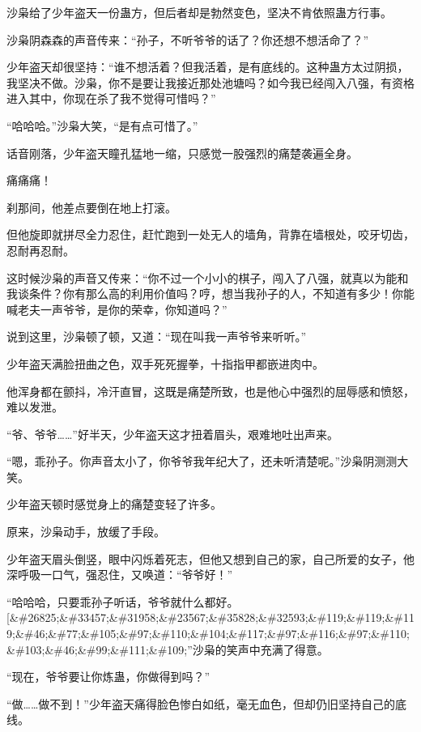 
\begin{this_body}

沙枭给了少年盗天一份蛊方，但后者却是勃然变色，坚决不肯依照蛊方行事。

沙枭阴森森的声音传来：“孙子，不听爷爷的话了？你还想不想活命了？”

少年盗天却很坚持：“谁不想活着？但我活着，是有底线的。这种蛊方太过阴损，我坚决不做。沙枭，你不是要让我接近那处池塘吗？如今我已经闯入八强，有资格进入其中，你现在杀了我不觉得可惜吗？”

“哈哈哈。”沙枭大笑，“是有点可惜了。”

话音刚落，少年盗天瞳孔猛地一缩，只感觉一股强烈的痛楚袭遍全身。

痛痛痛！

刹那间，他差点要倒在地上打滚。

但他旋即就拼尽全力忍住，赶忙跑到一处无人的墙角，背靠在墙根处，咬牙切齿，忍耐再忍耐。

这时候沙枭的声音又传来：“你不过一个小小的棋子，闯入了八强，就真以为能和我谈条件？你有那么高的利用价值吗？哼，想当我孙子的人，不知道有多少！你能喊老夫一声爷爷，是你的荣幸，你知道吗？”

说到这里，沙枭顿了顿，又道：“现在叫我一声爷爷来听听。”

少年盗天满脸扭曲之色，双手死死握拳，十指指甲都嵌进肉中。

他浑身都在颤抖，冷汗直冒，这既是痛楚所致，也是他心中强烈的屈辱感和愤怒，难以发泄。

“爷、爷爷……”好半天，少年盗天这才扭着眉头，艰难地吐出声来。

“嗯，乖孙子。你声音太小了，你爷爷我年纪大了，还未听清楚呢。”沙枭阴测测大笑。

少年盗天顿时感觉身上的痛楚变轻了许多。

原来，沙枭动手，放缓了手段。

少年盗天眉头倒竖，眼中闪烁着死志，但他又想到自己的家，自己所爱的女子，他深呼吸一口气，强忍住，又唤道：“爷爷好！”

“哈哈哈，只要乖孙子听话，爷爷就什么都好。[\&\#26825;\&\#33457;\&\#31958;\&\#23567;\&\#35828;\&\#32593;\&\#119;\&\#119;\&\#119;\&\#46;\&\#77;\&\#105;\&\#97;\&\#110;\&\#104;\&\#117;\&\#97;\&\#116;\&\#97;\&\#110;\&\#103;\&\#46;\&\#99;\&\#111;\&\#109;”沙枭的笑声中充满了得意。

“现在，爷爷要让你炼蛊，你做得到吗？”

“做……做不到！”少年盗天痛得脸色惨白如纸，毫无血色，但却仍旧坚持自己的底线。


\end{this_body}
